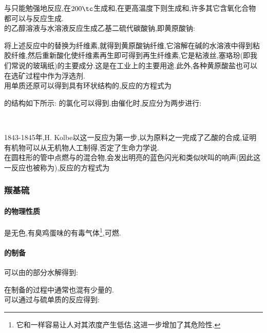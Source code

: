 \documentclass[draft]{ctexart}
\begin{document}
\indent {}与只能勉强地反应,在$200\tc$生成和,在更高温度下则生成和,许多其它含氧化合物都可以与反应生成.\\
\indent {}的乙醇溶液与水溶液反应生成乙基二硫代碳酸钠,即黄原酸钠:
\begin{center}
\end{center}
将上述反应中的替换为纤维素,就得到黄原酸钠纤维,它溶解在碱的水溶液中得到粘胶纤维,然后重新酸化使纤维素再生即可得到再生纤维素,它是粘液丝,塞珞玢(即我们常说的玻璃纸)的主要成分.这是在工业上的主要用途.此外,各种黄原酸盐也可以在选矿过程中作为浮选剂.\\
\indent 用单质还原可以得到具有环状结构的,反应的方程式为
\begin{center}
\end{center}
的结构如下所示:
\indent {}的氯化可以得到.由催化时,反应分为两步进行:
\begin{center}
    \\
\end{center}
1843-1845年,H. Kolbe以这一反应为第一步,以为原料之一完成了乙酸的合成,证明有机物可以从无机物人工制得,否定了生命力学说.\\
\indent 在圆柱形的管中点燃与的混合物,会发出明亮的蓝色闪光和类似吠叫的响声(因此这一反应也被称为),反应的方程式为
\begin{center}
\end{center}
\subsubsection{羰基硫}
\paragraph{的物理性质}
是无色,有臭鸡蛋味的有毒气体\footnote{它和一样容易让人对其浓度产生低估,这进一步增加了其危险性.},可燃.
\paragraph{的制备}
可以由的部分水解得到:
\begin{center}
\end{center}
在制备的过程中通常也混有少量的.\\
\indent {}可以通过与硫单质的反应得到:
\begin{center}
\end{center}
\end{document}
